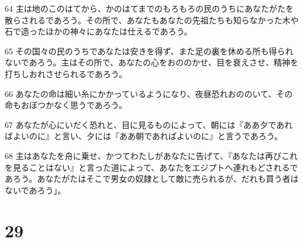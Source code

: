 \par 64 主は地のこのはてから、かのはてまでのもろもろの民のうちにあなたがたを散らされるであろう。その所で、あなたもあなたの先祖たちも知らなかった木や石で造ったほかの神々にあなたは仕えるであろう。
\par 65 その国々の民のうちであなたは安きを得ず、また足の裏を休める所も得られないであろう。主はその所で、あなたの心をおののかせ、目を衰えさせ、精神を打ちしおれさせられるであろう。
\par 66 あなたの命は細い糸にかかっているようになり、夜昼恐れおののいて、その命もおぼつかなく思うであろう。
\par 67 あなたが心にいだく恐れと、目に見るものによって、朝には『ああ夕であればよいのに』と言い、夕には『ああ朝であればよいのに』と言うであろう。
\par 68 主はあなたを舟に乗せ、かつてわたしがあなたに告げて、『あなたは再びこれを見ることはない』と言った道によって、あなたをエジプトへ連れもどされるであろう。あなたがたはそこで男女の奴隷として敵に売られるが、だれも買う者はないであろう」。

\chapter{29}

